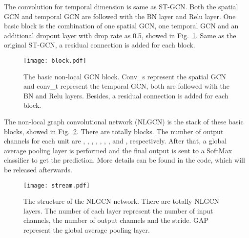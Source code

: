 \documentclass[10pt,twocolumn,letterpaper]{article}
\begin{document}
    The convolution for temporal dimension is same as ST-GCN. Both the spatial GCN and temporal GCN are followed with the BN layer and Relu layer. One basic block is the combination of one spatial GCN, one temporal GCN and an additional dropout layer with drop rate as 0.5, showed in Fig.~\ref{fig:block}. Same as the original ST-GCN, a residual connection is added for each block.
    
\begin{figure}[!htb]
	\begin{center}
	\texttt{[image: block.pdf]}
	\caption{The basic non-local GCN block. Conv\_s represent the spatial GCN and conv\_t represent the temporal GCN, both are followed with the BN and Relu layers. Besides, a residual connection is added for each block.}
	\label{fig:block}	
	\end{center}
	\end{figure}

    The non-local graph convolutional network (NLGCN) is the stack of these basic blocks, showed in Fig.~\ref{fig:stream}. There are totally  blocks. The number of output channels for each unit are , , , , , , ,  and , respectively. After that, a global average pooling layer is performed and the final output is sent to a SoftMax classifier to get the prediction. More details can be found in the code, which will be released afterwards.
    
    \begin{figure}[!htb]
	\begin{center}
	\texttt{[image: stream.pdf]}
	\caption{The structure of the NLGCN network. There are totally  NLGCN layers. The number of each layer represent the number of input channels, the number of output channels and the stride. GAP represent the global average pooling layer.}
	\label{fig:stream}	
	\end{center}
	\end{figure}
    
\end{document}

